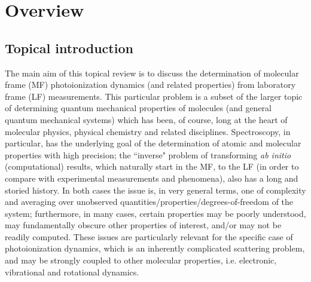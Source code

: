 \documentclass[10pt]{article}
\begin{document}



\section{Overview}

\subsection{Topical introduction}
The main aim of this topical review is to discuss the determination of molecular frame (MF) photoionization dynamics (and related properties) from laboratory frame (LF) measurements. This particular problem is a subset of the larger topic of determining quantum mechanical properties of molecules (and general quantum mechanical systems) which has been, of course, long at the heart of molecular physics, physical chemistry and related disciplines. Spectroscopy, in particular, has the underlying goal of the determination of atomic and molecular properties with high precision; the ``inverse" problem of transforming \textit{ab initio} (computational) results, which naturally start in the MF, to the LF (in order to compare with experimental measurements and phenomena), also has a long and storied history. In both cases the issue is, in very general terms, one of complexity and averaging over unobserved quantities/properties/degrees-of-freedom of the system; furthermore, in many cases, certain properties may be poorly understood, may fundamentally obscure other properties of interest, and/or may not be readily computed. These issues are particularly relevant for the specific case of photoionization dynamics, which is an inherently complicated scattering problem, and may be strongly coupled to other molecular properties, i.e. electronic, vibrational and rotational dynamics. 
\end{document}
